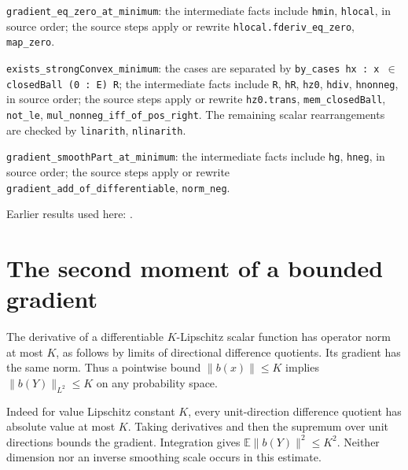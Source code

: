 \documentclass[11pt,a4paper]{article}
\begin{document}
\begin{leanbox}
\texttt{gradient\_\allowbreak{}eq\_\allowbreak{}zero\_\allowbreak{}at\_\allowbreak{}minimum}: the intermediate facts include \texttt{hmin}, \texttt{hlocal}, in source order; the source steps apply or rewrite \texttt{hlocal.\allowbreak{}fderiv\_\allowbreak{}eq\_\allowbreak{}zero}, \texttt{map\_\allowbreak{}zero}.



\texttt{exists\_\allowbreak{}strong\allowbreak{}Convex\_\allowbreak{}minimum}: the cases are separated by \texttt{by\_\allowbreak{}cases hx : x \ensuremath{\in} closed\allowbreak{}Ball (0 : E) R}; the intermediate facts include \texttt{R}, \texttt{h\allowbreak{}R}, \texttt{hz0}, \texttt{hdiv}, \texttt{hnonneg}, in source order; the source steps apply or rewrite \texttt{hz0.\allowbreak{}trans}, \texttt{mem\_\allowbreak{}closed\allowbreak{}Ball}, \texttt{not\_\allowbreak{}le}, \texttt{mul\_\allowbreak{}nonneg\_\allowbreak{}iff\_\allowbreak{}of\_\allowbreak{}pos\_\allowbreak{}right}. The remaining scalar rearrangements are checked by \texttt{linarith}, \texttt{nlinarith}.



\texttt{gradient\_\allowbreak{}smooth\allowbreak{}Part\_\allowbreak{}at\_\allowbreak{}minimum}: the intermediate facts include \texttt{hg}, \texttt{hneg}, in source order; the source steps apply or rewrite \texttt{gradient\_\allowbreak{}add\_\allowbreak{}of\_\allowbreak{}differentiable}, \texttt{norm\_\allowbreak{}neg}.
\end{leanbox}


Earlier results used here: \cite[Section~3.26.5]{LangevinLean2026ULASC}.

\section{\texorpdfstring{The second moment of a bounded gradient}{The second moment of a bounded gradient}}


The derivative of a differentiable \(K\)-Lipschitz scalar function has operator norm at most \(K\), as follows by limits of directional difference quotients. Its gradient has the same norm. Thus a pointwise bound \(\|b(x)\|\le K\) implies \(\|b(Y)\|_{L^2}\le K\) on any probability space.



Indeed for value Lipschitz constant \(K\), every unit-direction difference quotient has absolute value at most \(K\). Taking derivatives and then the supremum over unit directions bounds the gradient. Integration gives \(\mathbb E\|b(Y)\|^2\le K^2\). Neither dimension nor an inverse smoothing scale occurs in this estimate.
\end{document}
